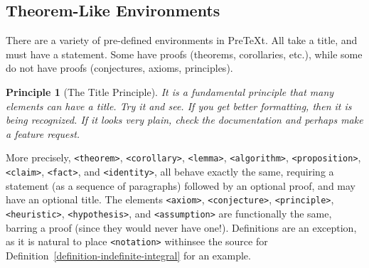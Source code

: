 \documentclass{sn-jnl}
\theoremstyle{thmstyleone}%
\theoremstyle{thmstyletwo}%
\newtheorem{principle}[theorem]{Principle}
\theoremstyle{thmstylethree}%
\newcommand{\xreffont}{\relax}
\newcommand{\mono}[1]{\texttt{#1}}
\numberwithin{equation}{section}
\begin{document}
\subsection{Theorem-Like Environments}\label{section-interesting-corollary-6}%
There are a variety of pre-defined environments in PreTeXt.  All take a title, and must have a statement.  Some have proofs (theorems, corollaries, etc.\@), while some do not have proofs (conjectures, axioms, principles).%
\begin{principle}[The Title Principle]\label{principle-principle}%
%
It is a fundamental principle that many elements can have a title.  Try it and see. If you get better formatting, then it is being recognized.  If it looks very plain, check the documentation and perhaps make a feature request.%
\end{principle}
More precisely, \mono{<theorem>}, \mono{<corollary>}, \mono{<lemma>}, \mono{<algorithm>}, \mono{<proposition>}, \mono{<claim>}, \mono{<fact>}, and \mono{<identity>}, all behave exactly the same, requiring a statement (as a sequence of paragraphs) followed by an optional proof, and may have an optional title.  The elements \mono{<axiom>}, \mono{<conjecture>}, \mono{<principle>}, \mono{<heuristic>}, \mono{<hypothesis>}, and \mono{<assumption>} are functionally the same, barring a proof (since they would never have one!).  Definitions are an exception, as it is natural to place \mono{<notation>} within\textemdash{}see the source for Definition~\hyperref[definition-indefinite-integral]{{\xreffont\ref{definition-indefinite-integral}}} for an example.%
%
%
\typeout{************************************************}
\typeout{************************************************}
%
\end{document}
